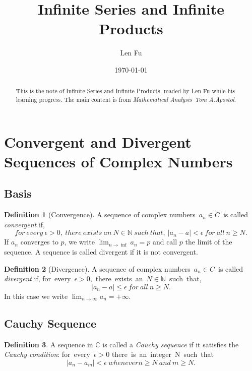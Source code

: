 \documentclass{article}
\title{Infinite Series and Infinite Products}
\author{Len Fu}
\date{\today}
\theoremstyle{definition}
\newtheorem{defi}{Definition}[section]
\begin{document}
\maketitle

\begin{abstract}
This is the note of Infinite Series and Infinite Products,
 maded by Len Fu while his learning progress.
 The main content is from \textit{Mathematical Analysis\ Tom A.Apostol}.
\end{abstract}
\newpage

\renewcommand{\contentsname}{Contents}
\tableofcontents
\newpage

\section{Convergent and Divergent Sequences of Complex Numbers}
\subsection{Basis}

\begin{defi}[Convergence]
A sequence of complex numbers\ $a_{n}\in C$\ is called \textit{convergent} if,
$$for\ every\ \epsilon>0,\ there\ exists\ an\ N\in\mathbb{N}\ such\ that,\
|a_{n}-a|<\epsilon\ for\ all\ n\geq N.$$
If ${a_{n}}$ converges to $p$, we write $\lim_{n\rightarrow\inf}a_{n}=p$ and call
$p$ the limit of the sequence. A sequence is called divergent if it is not convergent.
\end{defi}


\begin{defi}[Divergence]
A sequence of complex numbers\ $a_{n}\in C$\ is called \textit{divergent} if,
for\ every\ $\epsilon>0$,\ there\ exists\ an\ $N\in\mathbb{N}$\ such\ that,
$$|a_{n}-a|\leq\epsilon\ for\ all\ n\geq N.$$
In this case we write $\lim_{n\rightarrow\infty}a_{n}=+\infty$.
\end{defi}

\subsection{Cauchy Sequence}

\begin{defi}
A sequence in $\mathbb{C}$ is called a \textit{Cauchy sequence} if it satisfies the 
\textit{Cauchy condition}:
for\ every\ $\epsilon>0$ there\ is\ an\ integer\ N\ such\ that\
$$|a_{n}-a_{m}|<\epsilon\ whenever n\geq N\ and\ m\geq N.$$
\end{defi}
\end{document}
